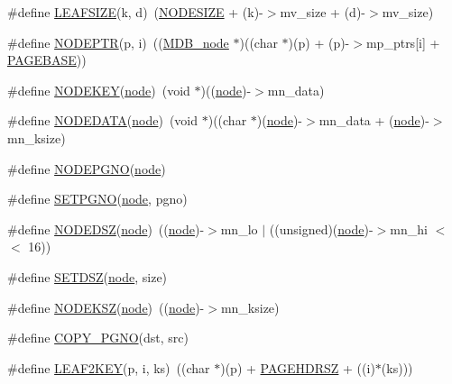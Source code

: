 \begin{DoxyCompactItemize}
\item 
\#define \mbox{\hyperlink{group__internal_gacf0931b7f08df74abb803b41692ef965}{L\+E\+A\+F\+S\+I\+ZE}}(k,  d)~(\mbox{\hyperlink{group__internal_ga7d24748fedf732c90d840cbf0714d8d8}{N\+O\+D\+E\+S\+I\+ZE}} + (k)-\/$>$mv\+\_\+size + (d)-\/$>$mv\+\_\+size)
\item 
\#define \mbox{\hyperlink{group__internal_gadd8222b06a62d77398a5d719e973a66d}{N\+O\+D\+E\+P\+TR}}(p,  i)~((\mbox{\hyperlink{struct_m_d_b__node}{M\+D\+B\+\_\+node}} $\ast$)((char $\ast$)(p) + (p)-\/$>$mp\+\_\+ptrs\mbox{[}i\mbox{]} + \mbox{\hyperlink{group__internal_ga42d35f5d5bf3f161dc064ac7f78a2838}{P\+A\+G\+E\+B\+A\+SE}}))
\item 
\#define \mbox{\hyperlink{group__internal_ga0c2d3ecf490b76fd5ef32aa4082edefe}{N\+O\+D\+E\+K\+EY}}(\mbox{\hyperlink{structnode}{node}})~(void $\ast$)((\mbox{\hyperlink{structnode}{node}})-\/$>$mn\+\_\+data)
\item 
\#define \mbox{\hyperlink{group__internal_gaaa3f3816301d68365052b69a0c1464e1}{N\+O\+D\+E\+D\+A\+TA}}(\mbox{\hyperlink{structnode}{node}})~(void $\ast$)((char $\ast$)(\mbox{\hyperlink{structnode}{node}})-\/$>$mn\+\_\+data + (\mbox{\hyperlink{structnode}{node}})-\/$>$mn\+\_\+ksize)
\item 
\#define \mbox{\hyperlink{group__internal_gabc71d778f3391485aee252505fb06e90}{N\+O\+D\+E\+P\+G\+NO}}(\mbox{\hyperlink{structnode}{node}})
\item 
\#define \mbox{\hyperlink{group__internal_ga220e51ef0d2da4d4ff58e94065eaa095}{S\+E\+T\+P\+G\+NO}}(\mbox{\hyperlink{structnode}{node}},  pgno)
\item 
\#define \mbox{\hyperlink{group__internal_ga8f307b7c4ebae2194b30328bc87c4070}{N\+O\+D\+E\+D\+SZ}}(\mbox{\hyperlink{structnode}{node}})~((\mbox{\hyperlink{structnode}{node}})-\/$>$mn\+\_\+lo $\vert$ ((unsigned)(\mbox{\hyperlink{structnode}{node}})-\/$>$mn\+\_\+hi $<$$<$ 16))
\item 
\#define \mbox{\hyperlink{group__internal_ga737db862c118cd893ac8d6a87f6175fe}{S\+E\+T\+D\+SZ}}(\mbox{\hyperlink{structnode}{node}},  size)
\item 
\#define \mbox{\hyperlink{group__internal_gaa680cb94fd0c91a8818205fcef2d1b53}{N\+O\+D\+E\+K\+SZ}}(\mbox{\hyperlink{structnode}{node}})~((\mbox{\hyperlink{structnode}{node}})-\/$>$mn\+\_\+ksize)
\item 
\#define \mbox{\hyperlink{group__internal_gaa2e6eaaa9f8fcfd2078846caf2249895}{C\+O\+P\+Y\+\_\+\+P\+G\+NO}}(dst,  src)
\item 
\#define \mbox{\hyperlink{group__internal_ga7c01a3e255fb83aab9136fc9a840858a}{L\+E\+A\+F2\+K\+EY}}(p,  i,  ks)~((char $\ast$)(p) + \mbox{\hyperlink{group__internal_gae25bcf0c0c5c5ead27e82543cbce02e1}{P\+A\+G\+E\+H\+D\+R\+SZ}} + ((i)$\ast$(ks)))
$$
\end{DoxyCompactItemize}
